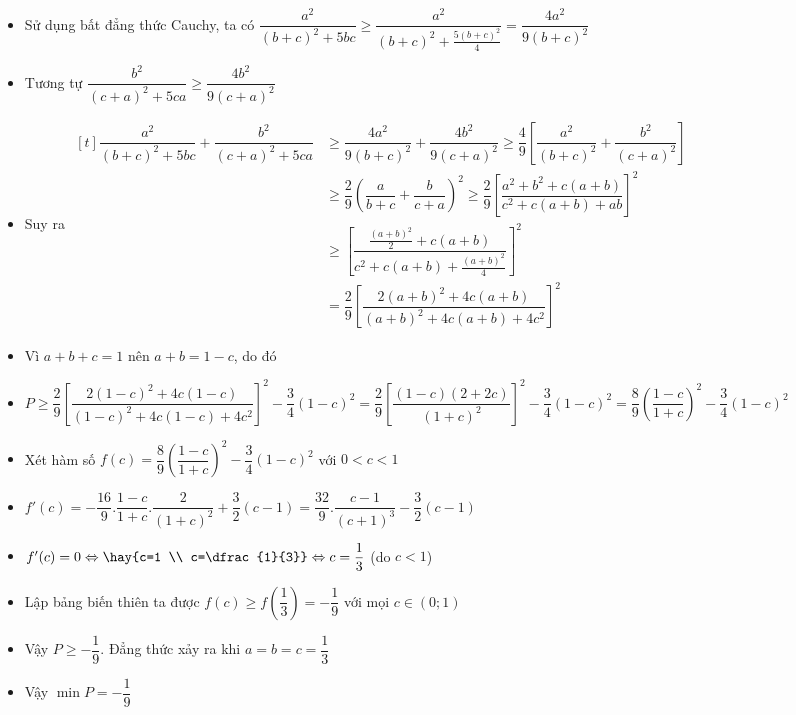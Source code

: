 \lgi 
\begin{itemize}[label=,leftmargin=*]
\item Sử dụng bất đẳng thức Cauchy, ta có $\dfrac{a^2}{(b+c)^2+5bc}\ge \dfrac{a^2}{(b+c)^2+\frac{5(b+c)^2}{4}}= \dfrac{4a^2}{9(b+c)^2}$
\item Tương tự $\dfrac{b^2}{(c+a)^2+5ca}\ge \dfrac{4b^2}{9(c+a)^2}$
\item Suy ra $\begin{aligned}[t]\dfrac{a^2}{(b+c)^2+5bc} +\dfrac{b^2}{(c+a)^2+5ca} &\ge \dfrac{4a^2}{9(b+c)^2}+\dfrac{4b^2}{9(c+a)^2}\ge \dfrac{4}{9}\left[\dfrac{a^2}{(b+c)^2}+\dfrac{b^2}{(c+a)^2} \right] \\
&\ge \dfrac{2}{9}\left(\dfrac{a}{b+c}+\dfrac{b}{c+a} \right)^2\ge \dfrac{2}{9}\left[\dfrac{a^2+b^2+c(a+b)}{c^2+c(a+b)+ab} \right]^2 \\
&\ge \left[\dfrac{\frac{(a+b)^2}{2}+c(a+b)}{c^2+c(a+b)+\frac{(a+b)^2}{4}} \right]^2 \\
&=\dfrac{2}{9}\left[\dfrac{2(a+b)^2+4c(a+b)}{(a+b)^2+4c(a+b)+4c^2} \right]^2
 \end{aligned}$
 \item Vì $a+b+c=1$ nên $a+b=1-c$, do đó
 \item $P\ge \dfrac{2}{9}\left[\dfrac{2(1-c)^2+4c(1-c)}{(1-c)^2+4c(1-c)+4c^2} \right]^2-\dfrac{3}{4}(1-c)^2=\dfrac{2}{9}\left[\dfrac{(1-c)(2+2c)}{(1+c)^2} \right]^2-\dfrac{3}{4}(1-c)^2=\dfrac{8}{9}\left(\dfrac{1-c}{1+c} \right)^2-\dfrac{3}{4}(1-c)^2$
 \item Xét hàm số $f(c)=\dfrac{8}{9}	\left(\dfrac{1-c}{1+c} \right)^2-\dfrac{3}{4}(1-c)^2$ với $0<c<1$
 \item $f'(c)=-\dfrac{16}{9}.\dfrac{1-c}{1+c}.\dfrac{2}{(1+c)^2}+\dfrac{3}{2}(c-1)=\dfrac{32}{9}.\dfrac{c-1}{(c+1)^3}-\dfrac{3}{2}(c-1)$
 \item $f'(c)=0 \Leftrightarrow \hay{c=1 \\ c=\dfrac{1}{3}}\Leftrightarrow c=\dfrac{1}{3}$ (do $c<1$)
 \item Lập bảng biến thiên ta được $f(c)\ge f\left(\dfrac{1}{3} \right)=-\dfrac{1}{9}$ với mọi $c\in (0;1)$
 \item Vậy $P\ge -\dfrac{1}{9}$. Đẳng thức xảy ra khi $a=b=c=\dfrac{1}{3}$
 \item Vậy $\min P=-\dfrac{1}{9}$
\end{itemize}

